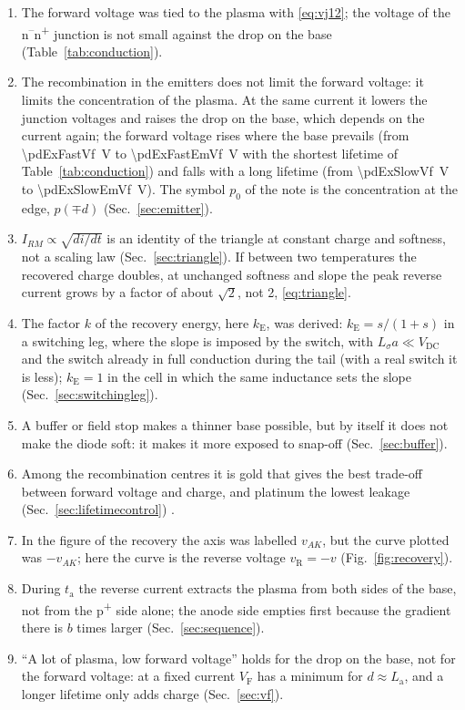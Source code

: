 \documentclass[10pt,a4paper]{scrartcl}
\newcommand{\VF}{V_\mathrm{F}}
\newcommand{\ta}{t_\mathrm{a}}
\newcommand{\Ls}{L_\sigma}                    %
\newcommand{\La}{L_\mathrm{a}}
\newcommand{\Vdc}{V_\mathrm{DC}}
\newcommand{\Pp}{p\textsuperscript{+}}
\newcommand{\Nm}{n\textsuperscript{--}}
\newcommand{\Np}{n\textsuperscript{+}}
\begin{document}
\begin{enumerate}
\item The forward voltage was tied to the plasma with \eqref{eq:vj12}; the voltage of the \Nm\Np{} junction is not small against the drop on the base (Table~\ref{tab:conduction}).
\item The recombination in the emitters does not limit the forward voltage: it limits the concentration of the plasma. At the same current it lowers the junction voltages and raises the drop on the base, which depends on the current again; the forward voltage rises where the base prevails (from \SI{\pdExFastVf}{\volt} to \SI{\pdExFastEmVf}{\volt} with the shortest lifetime of Table~\ref{tab:conduction}) and falls with a long lifetime (from \SI{\pdExSlowVf}{\volt} to \SI{\pdExSlowEmVf}{\volt}). The symbol $p_0$ of the note is the concentration at the edge, $p(\mp d)$ (Sec.~\ref{sec:emitter}).
\item $I_{RM} \propto \sqrt{di/dt}$ is an identity of the triangle at constant charge and softness, not a scaling law (Sec.~\ref{sec:triangle}). If between two temperatures the recovered charge doubles, at unchanged softness and slope the peak reverse current grows by a factor of about $\sqrt{2}$, not 2, \eqref{eq:triangle}.
\item The factor $k$ of the recovery energy, here $k_\mathrm{E}$, was derived: $k_\mathrm{E} = s/(1+s)$ in a switching leg, where the slope is imposed by the switch, with $\Ls a \ll \Vdc$ and the switch already in full conduction during the tail (with a real switch it is less); $k_\mathrm{E} = 1$ in the cell in which the same inductance sets the slope (Sec.~\ref{sec:switchingleg}).
\item A buffer or field stop makes a thinner base possible, but by itself it does not make the diode soft: it makes it more exposed to snap-off (Sec.~\ref{sec:buffer}).
\item Among the recombination centres it is gold that gives the best trade-off between forward voltage and charge, and platinum the lowest leakage (Sec.~\ref{sec:lifetimecontrol}) \cite{baligasun1977}.
\item In the figure of the recovery the axis was labelled $v_{AK}$, but the curve plotted was $-v_{AK}$; here the curve is the reverse voltage $v_\mathrm{R} = -v$ (Fig.~\ref{fig:recovery}).
\item During $\ta$ the reverse current extracts the plasma from both sides of the base, not from the \Pp{} side alone; the anode side empties first because the gradient there is $b$ times larger (Sec.~\ref{sec:sequence}).
\item ``A lot of plasma, low forward voltage'' holds for the drop on the base, not for the forward voltage: at a fixed current $\VF$ has a minimum for $d \approx \La$, and a longer lifetime only adds charge (Sec.~\ref{sec:vf}).

\end{enumerate}
\end{document}
